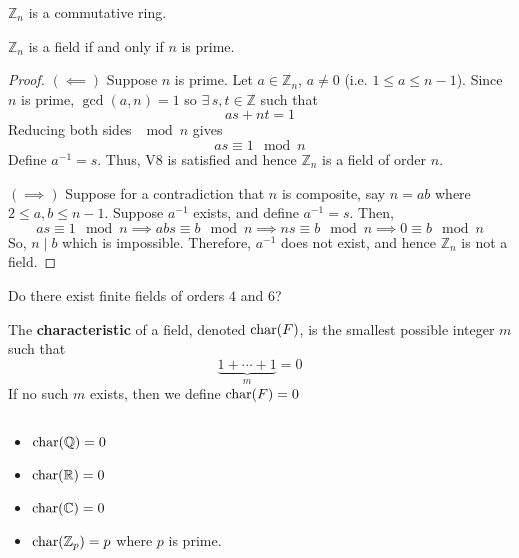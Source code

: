 \begin{thmbox}
    \begin{theorem}
        $ \mathbb{Z}_n $ is a commutative ring.
    \end{theorem}
\end{thmbox}

\begin{thmbox}
    \begin{theorem}
        $ \mathbb{Z}_n $ is a field if and only if $ n $ is prime.
    \end{theorem}
\end{thmbox}

\begin{proof}
    $ (\impliedby) $ Suppose $ n $ is prime. Let $ a\in\mathbb{Z}_n $, $ a\neq 0 $
    (i.e. $ 1\leqslant a\leqslant n-1 $). Since $ n $ is prime, $ \gcd(a,n)=1 $
    so $ \exists\,s,t\in\mathbb{Z} $ such that
    \[ as+nt=1 \]
    Reducing both sides $ \mod n $ gives
    \[ as\equiv 1 \mod n \]
    Define $ a^{-1}=s $. Thus, V8 is satisfied and hence $ \mathbb{Z}_n $
    is a field of order $ n $.

    $ (\implies) $ Suppose for a contradiction that $ n $ is composite, say $ n=ab $
    where $ 2\leqslant a,b\leqslant n-1 $. Suppose $ a^{-1} $ exists, and define
    $ a^{-1}=s $. Then,
    \[ as\equiv 1 \mod n\implies abs\equiv b\mod n\implies ns\equiv b \mod n
        \implies 0\equiv b\mod n \]
    So, $ n\mid b $ which is impossible. Therefore, $ a^{-1} $ does not exist, and hence
    $ \mathbb{Z}_n $ is not a field.
\end{proof}

 Do there exist finite fields of orders $ 4 $ and $ 6 $?

\begin{defbox}
    \begin{definition}
        The \textbf{characteristic} of a field, denoted $ \operatorname{char}(F) $, is the smallest
        possible integer $ m $ such that
        \[ \underbrace{1+\cdots+1}_{m}=0 \]
        If no such $ m $ exists, then we define $ \operatorname{char}(F)=0 $
    \end{definition}
\end{defbox}

\begin{exbox}
    \begin{example} $ \; $
        \begin{itemize}
            \item $ \operatorname{char}(\mathbb{Q})=0 $
            \item $ \operatorname{char}(\mathbb{R})=0 $
            \item $ \operatorname{char}(\mathbb{C})=0 $
            \item $ \operatorname{char}(\mathbb{Z}_p)=p $ where $ p $ is prime.
        \end{itemize}
    \end{example}
\end{exbox}

